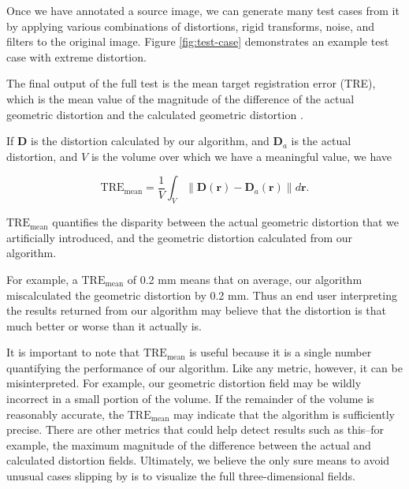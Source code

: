\documentclass[12pt]{article}
\begin{document}
Once we have annotated a source image, we can generate many test cases from it by applying various combinations of distortions, rigid transforms, noise, and filters to the original image.  Figure \ref{fig:test-case} demonstrates an example test case with extreme distortion.

The final output of the full test is the mean target registration error (TRE), which is the mean value of the magnitude of the difference of the actual geometric distortion and the calculated geometric distortion \cite[page R37]{hill2001}.

If $\textbf{D}$ is the distortion calculated by our algorithm, and $\textbf{D}_a$ is the actual distortion, and $V$ is the volume over which we have a meaningful value, we have

$$
\textrm{TRE}_\textrm{mean} = \frac{1}{V}\int_V \| \textbf{D}(\textbf{r}) - \textbf{D}_a(\textbf{r}) \| d\textbf{r}.
$$

$\textrm{TRE}_\textrm{mean}$ quantifies the disparity between the actual geometric distortion that we artificially introduced, and the geometric distortion calculated from our algorithm.

For example, a $\textrm{TRE}_\textrm{mean}$ of 0.2 mm means that on average, our algorithm miscalculated the geometric distortion by 0.2 mm.  Thus an end user interpreting the results returned from our algorithm may believe that the distortion is that much better or worse than it actually is.

It is important to note that $\textrm{TRE}_\textrm{mean}$ is useful because it is a single number quantifying the performance of our algorithm.  Like any metric, however, it can be misinterpreted.  For example, our geometric distortion field may be wildly incorrect in a small portion of the volume.  If the remainder of the volume is reasonably accurate, the $\textrm{TRE}_\textrm{mean}$ may indicate that the algorithm is sufficiently precise.  There are other metrics that could help detect results such as this--for example, the maximum magnitude of the difference between the actual and calculated distortion fields.  Ultimately, we believe the only sure means to avoid unusual cases slipping by is to visualize the full three-dimensional fields.
\end{document}

